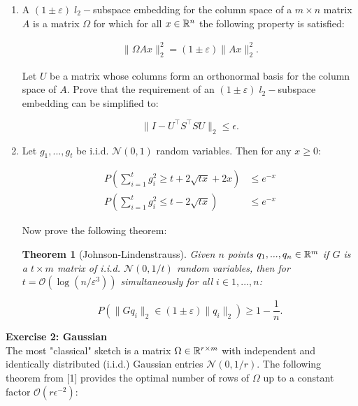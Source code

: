 \documentclass[11pt]{article}
\newcommand\bigO[1]{{\ensuremath{\mathcal{O}(#1)}}}
\newtheorem{theorem}{Theorem}
\begin{document}
\begin{enumerate}
    \item A $(1 \pm \varepsilon) \; l_2-$subspace embedding for the column space of a $m \times n$ matrix $A$ is a matrix $\Omega$ for which for all $x \in \mathbb{R}^{n}$ the following property is satisfied:
    
    \begin{align}
    \label{def:eps embedding}
    \|\Omega A x\|_2^2 = (1 \pm \varepsilon)\|A x\|_2^2.
    \end{align}

Let $U$ be a matrix whose columns form an orthonormal basis for the column space of $A$. Prove that the requirement of an $(1 \pm \varepsilon) \; l_2-$subspace embedding can be simplified to:

\[ \|I - U^\top S^\top S U \|_2 \leq \epsilon. \] 

\item Let $g_1, ..., g_t$ be i.i.d. $\mathcal{N}(0,1)$ random variables. Then for any $x \geq 0$:

\begin{align*}
P\left( \sum_{i = 1}^t g_i^2 \geq t + 2 \sqrt{tx} + 2x \right) &\leq e^{-x} \\
P\left( \sum_{i = 1}^t g_i^2 \leq t - 2 \sqrt{tx} \right) &\leq e^{-x}
\end{align*}

Now prove the following theorem:

\begin{theorem}[Johnson-Lindenstrauss]
\label{Lemma18}
Given $n$ points $q_1, ..., q_n \in \mathbb{R}^m$ if $G$ is a $t \times m$ matrix of i.i.d. $\mathcal{N}(0, 1/t)$ random variables, then for $t = \bigO{\log(n/\varepsilon^3)}$ simultaneously for all $i \in 1, ..., n$:

\[ P\left( \|Gq_i\|_2 \in (1 \pm \varepsilon) \|q_i\|_2 \right) \geq 1 - \frac{1}{n}. \]
 
\end{theorem}


\end{enumerate}



{\bf{Exercise 2: Gaussian}}\\

The most "classical" sketch is a matrix $\Omega \in \mathbb{R}^{r \times m}$ with independent and identically distributed (i.i.d.) Gaussian entries $\mathcal{N}(0, 1/r)$. The following theorem from [1] provides the optimal number of rows of $\Omega$ up to a constant factor $\bigO{r\epsilon^{-2}}$:
\end{document}
